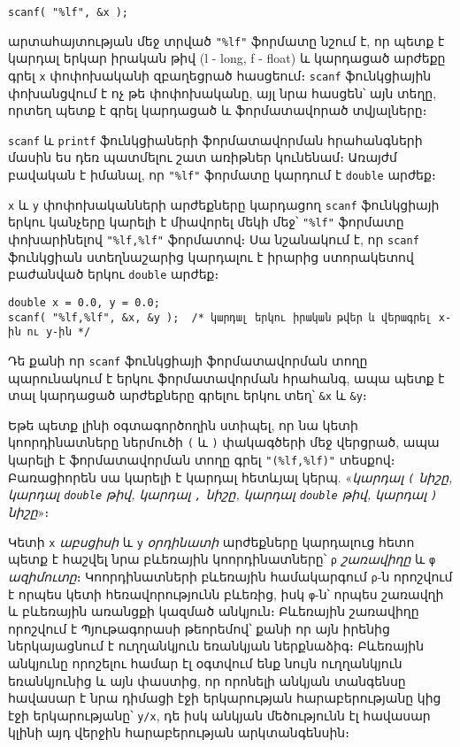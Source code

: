 \begin{verbatim}
scanf( "%lf", &x );
\end{verbatim}

արտահայտության մեջ տրված \texttt{"\%lf"} ֆորմատը նշում է, որ պետք է
կարդալ երկար իրական թիվ (l - long, f - float) և կարդացած արժեքը գրել
\texttt{x} փոփոխականի զբաղեցրած հասցեում։ \texttt{scanf} ֆունկցիային
փոխանցվում է ոչ թե փոփոխականը, այլ նրա հասցեն՝ այն տեղը, որտեղ պետք է
գրել կարդացած և ֆորմատավորած տվյալները։

\texttt{scanf} և \texttt{printf} ֆունկցիաների ֆորմատավորման հրահանգների
մասին ես դեռ պատմելու շատ առիթներ կունենամ։ Առայժմ բավական է իմանալ, որ
\texttt{"\%lf"} ֆորմատը կարդում է \texttt{double} արժեք։

\texttt{x} և \texttt{y} փոփոխականների արժեքները կարդացող \texttt{scanf}
ֆունկցիայի երկու կանչերը կարելի է միավորել մեկի մեջ՝ \texttt{"\%lf"}
ֆորմատը փոխարինելով \texttt{"\%lf,\%lf"} ֆորմատով։ Սա նշանակում է, որ
\texttt{scanf} ֆունկցիան ստեղնաշարից կարդալու է իրարից ստորակետով
բաժանված երկու \texttt{double} արժեք։

\begin{verbatim}
double x = 0.0, y = 0.0;
scanf( "%lf,%lf", &x, &y );  /* կարդալ երկու իրական թվեր և վերագրել x-ին ու y-ին */
\end{verbatim}

Դե քանի որ \texttt{scanf} ֆունկցիայի ֆորմատավորման տողը պարունակում է
երկու ֆորմատավորման հրահանգ, ապա պետք է տալ կարդացած արժեքները գրելու
երկու տեղ՝ \texttt{\&x} և \texttt{\&y}։

Եթե պետք լինի օգտագործողին ստիպել, որ նա կետի կոորդինատները ներմուծի
\texttt{(} և \texttt{)} փակագծերի մեջ վերցրած, ապա կարելի է
ֆորմատավորման տողը գրել \texttt{"(\%lf,\%lf)"} տեսքով։ Բառացիորեն սա
կարելի է կարդալ հետևյալ կերպ. «\emph{կարդալ \texttt{(} նիշը, կարդալ
\texttt{double} թիվ, կարդալ \texttt{,} նիշը, կարդալ \texttt{double} թիվ,
կարդալ \texttt{)} նիշը}»։

Կետի \texttt{x} \emph{աբսցիսի} և \texttt{y} \emph{օրդինատի} արժեքները
կարդալուց հետո պետք է հաշվել նրա բևեռային կոորդինատները՝ \texttt{ρ}
\emph{շառավիղը} և \texttt{φ} \emph{ազիմուտը}։ Կոորդինատների բևեռային
համակարգում \texttt{ρ}-ն որոշվում է որպես կետի հեռավորությունն բևեռից,
իսկ \texttt{φ}-ն՝ որպես շառավղի և բևեռային առանցքի կազմած անկյուն։
Բևեռային շառավիղը որոշվում է Պյութագորասի թեորեմով՝ քանի որ այն իրենից
ներկայացնում է ուղղանկյուն եռանկյան ներքնաձիգ։ Բևեռային անկյունը
որոշելու համար էլ օգտվում ենք նույն ուղղանկյուն եռանկյունից և այն
փաստից, որ որոնելի անկյան տանգենսը հավասար է նրա դիմացի էջի երկարության
հարաբերությանը կից էջի երկարությանը՝ \texttt{y/x}, դե իսկ անկյան
մեծությունն էլ հավասար կլինի այդ վերջին հարաբերության արկտանգենսին։

